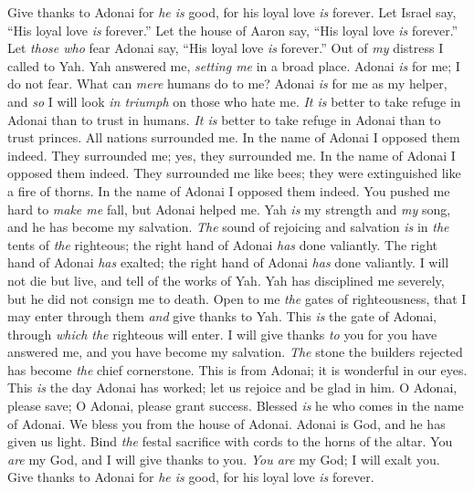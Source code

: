 \begin{biblechapter} %
 Give thanks to Adonai for \textit{he is} good, 
for his loyal love \textit{is} forever.
\verse Let Israel say, 
“His loyal love \textit{is} forever.”
\verse Let the house of Aaron say, 
“His loyal love \textit{is} forever.”
\verse Let \textit{those who} fear Adonai say, 
“His loyal love \textit{is} forever.”
\verse Out of \textit{my} distress I called to Yah. 
Yah answered me, \textit{setting me} in a broad place.
\verse Adonai \textit{is} for me; I do not fear. 
What can \textit{mere} humans do to me?
\verse Adonai \textit{is} for me as my helper, 
and \textit{so} I will look \textit{in triumph} on those who hate me.
\verse \textit{It is} better to take refuge in Adonai 
than to trust in humans.
\verse \textit{It is} better to take refuge in Adonai 
than to trust princes.
\verse All nations surrounded me. 
In the name of Adonai I opposed them indeed.
\verse They surrounded me; yes, they surrounded me. 
In the name of Adonai I opposed them indeed.
\verse They surrounded me like bees; 
they were extinguished like a fire of thorns. 
In the name of Adonai I opposed them indeed.
\verse You pushed me hard to \textit{make me} fall, 
but Adonai helped me.
\verse Yah \textit{is} my strength and \textit{my} song, 
and he has become my salvation.
\verse \textit{The} sound of rejoicing and salvation 
\textit{is} in \textit{the} tents of \textit{the} righteous; 
the right hand of Adonai \textit{has} done valiantly.
\verse The right hand of Adonai \textit{has} exalted; 
the right hand of Adonai \textit{has} done valiantly.
\verse I will not die but live, 
and tell of the works of Yah.
\verse Yah has disciplined me severely, 
but he did not consign me to death.
\verse Open to me \textit{the} gates of righteousness, 
that I may enter through them 
\textit{and} give thanks to Yah.
\verse This \textit{is} the gate of Adonai, 
through \textit{which the} righteous will enter.
\verse I will give thanks \textit{to} you for you have answered me, 
and you have become my salvation.
\verse \textit{The} stone the builders rejected 
has become \textit{the} chief cornerstone.
\verse This is from Adonai; 
it is wonderful in our eyes.
\verse This \textit{is} the day Adonai has worked; 
let us rejoice and be glad in him.
\verse O Adonai, please save; 
O Adonai, please grant success.
\verse Blessed \textit{is} he who comes in the name of Adonai. 
We bless you from the house of Adonai.
\verse Adonai is God, and he has given us light. 
Bind \textit{the} festal sacrifice with cords 
to the horns of the altar.
\verse You \textit{are} my God, and I will give thanks to you. 
\textit{You are} my God; I will exalt you.
\verse Give thanks to Adonai for \textit{he is} good, 
for his loyal love \textit{is} forever.
\end{biblechapter}

